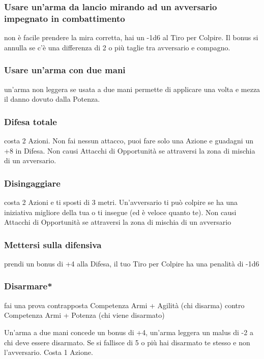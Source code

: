\documentclass[a4paper,11pt,twoside,openany]{book}
\begin{document}
\subsubsection{Usare un'arma da lancio mirando ad un avversario impegnato
in combattimento} non è facile prendere la mira corretta, hai un -1d6 al Tiro per Colpire. Il bonus si annulla se c'è una differenza di 2 o più taglie tra avversario e compagno.

\subsubsection{Usare un'arma con due mani} un'arma non leggera se usata a due mani permette di applicare una volta e mezza il danno dovuto dalla Potenza.

\subsubsection{Difesa totale} costa 2 Azioni. Non fai nessun attacco, puoi fare solo una Azione e guadagni un +8 in Difesa. Non causi Attacchi di Opportunità se attraversi la zona di mischia di un avversario.

\subsubsection{Disingaggiare} costa 2 Azioni e ti sposti di 3 metri. Un'avversario ti può colpire se ha una iniziativa migliore della tua o ti insegue (ed è veloce quanto te). Non causi Attacchi di Opportunità se attraversi la zona di mischia di un avversario

\subsubsection{Mettersi sulla difensiva} prendi un bonus di +4 alla Difesa, il tuo Tiro per Colpire ha una penalità di -1d6

\subsubsection{Disarmare*} fai una prova contrapposta Competenza Armi + Agilità (chi disarma) contro Competenza Armi + Potenza (chi viene disarmato)

Un'arma a due mani concede un bonus di +4, un'arma leggera un malus di -2 a chi deve essere disarmato. Se si fallisce di 5 o più hai disarmato te stesso e non l'avversario. Costa 1 Azione.
\end{document}
